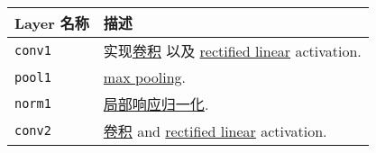 \begin{longtable}[c]{@{}ll@{}}
\toprule
\begin{minipage}[b]{0.05\columnwidth}\raggedright\strut
Layer 名称
\strut\end{minipage} &
\begin{minipage}[b]{0.05\columnwidth}\raggedright\strut
描述
\strut\end{minipage}\tabularnewline
\midrule
\endhead
\begin{minipage}[t]{0.05\columnwidth}\raggedright\strut
\lstinline{conv1}
\strut\end{minipage} &
\begin{minipage}[t]{0.05\columnwidth}\raggedright\strut
实现\href{https://github.com/jikexueyuanwiki/tensorflow-zh/blob/master/SOURCE/api_docs/python/nn.md\#conv2d}{卷积}
以及
\href{https://github.com/jikexueyuanwiki/tensorflow-zh/blob/master/SOURCE/api_docs/python/nn.md\#relu}{rectified
linear} activation.
\strut\end{minipage}\tabularnewline
\begin{minipage}[t]{0.05\columnwidth}\raggedright\strut
\lstinline{pool1}
\strut\end{minipage} &
\begin{minipage}[t]{0.05\columnwidth}\raggedright\strut
\href{https://github.com/jikexueyuanwiki/tensorflow-zh/blob/master/SOURCE/api_docs/python/nn.md\#max_pool}{max
pooling}.
\strut\end{minipage}\tabularnewline
\begin{minipage}[t]{0.05\columnwidth}\raggedright\strut
\lstinline{norm1}
\strut\end{minipage} &
\begin{minipage}[t]{0.05\columnwidth}\raggedright\strut
\href{https://github.com/jikexueyuanwiki/tensorflow-zh/blob/master/SOURCE/api_docs/python/nn.md\#local_response_normalization}{局部响应归一化}.
\strut\end{minipage}\tabularnewline
\begin{minipage}[t]{0.05\columnwidth}\raggedright\strut
\lstinline{conv2}
\strut\end{minipage} &
\begin{minipage}[t]{0.05\columnwidth}\raggedright\strut
\href{https://github.com/jikexueyuanwiki/tensorflow-zh/blob/master/SOURCE/api_docs/python/nn.md\#conv2d}{卷积}
and
\href{https://github.com/jikexueyuanwiki/tensorflow-zh/blob/master/SOURCE/api_docs/python/nn.md\#relu}{rectified
linear} activation.
\strut\end{minipage}\tabularnewline

\end{longtable}
